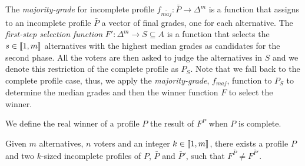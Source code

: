 \documentclass[version=3.21, pagesize, twoside=off, bibliography=totoc, DIV=calc, fontsize=12pt, a4paper]{scrartcl}
\begin{document}
The \emph{majority-grade} for incomplete profile $f_{\bar{maj}}: \bar{P} \rightarrow \Delta^m$ is a function that assigns to an incomplete profile $\bar{P}$ a vector of final grades, one for each alternative. The \emph{first-step selection function} $F':\Delta^{m} \rightarrow S \subseteq A$ is a function that selects the $s \in \llbracket1,m\rrbracket$ alternatives with the highest median grades as candidates for the second phase. All the voters are then asked to judge the alternatives in $S$ and we denote this restriction of the complete profile as $P_{S}$. Note that we fall back to the complete profile case, thus, we apply the \emph{majority-grade}, $f_{maj}$, function to $P_{S}$ to determine the median grades and then the winner function $F$ to select the winner.

\begin{definition}
	We define the real winner of a profile $P$ the result of $F^P$ when $P$ is complete.
\end{definition}

\begin{proposition}
	Given $m$ alternatives, $n$ voters and an integer $k \in \llbracket1,m\rrbracket$, there exists a profile $P$ and two $k$-sized incomplete profiles of $P$, $\bar{P}$ and $\bar{P}'$, such that $F^{\bar{P}} \neq F^{\bar{P}'}$.
\end{proposition}
\end{document}
